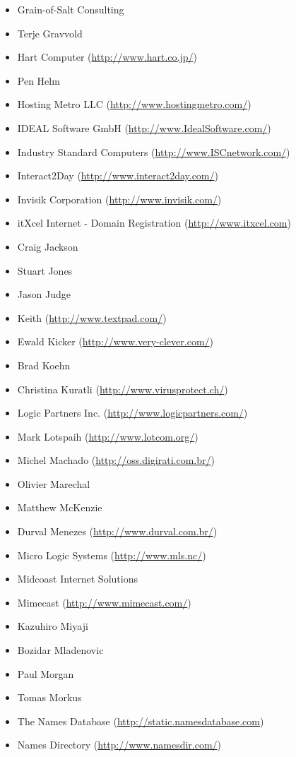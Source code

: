 \documentclass[a4paper,titlepage,12pt]{article}
\begin{document}
\begin{itemize}
	\item Grain-of-Salt Consulting
	\item Terje Gravvold
	\item Hart Computer (\url{http://www.hart.co.jp/})
	\item Pen Helm
	\item Hosting Metro LLC (\url{http://www.hostingmetro.com/})
	\item IDEAL Software GmbH (\url{http://www.IdealSoftware.com/})
	\item Industry Standard Computers (\url{http://www.ISCnetwork.com/})
	\item Interact2Day (\url{http://www.interact2day.com/})
	\item Invisik Corporation (\url{http://www.invisik.com/})
	\item itXcel Internet - Domain Registration (\url{http://www.itxcel.com})
	\item Craig Jackson
	\item Stuart Jones
	\item Jason Judge
	\item Keith (\url{http://www.textpad.com/})
	\item Ewald Kicker (\url{http://www.very-clever.com/})
	\item Brad Koehn
	\item Christina Kuratli (\url{http://www.virusprotect.ch/})
	\item Logic Partners Inc. (\url{http://www.logicpartners.com/})
	\item Mark Lotspaih (\url{http://www.lotcom.org/})
	\item Michel Machado (\url{http://oss.digirati.com.br/})
	\item Olivier Marechal
	\item Matthew McKenzie
	\item Durval Menezes (\url{http://www.durval.com.br/})
	\item Micro Logic Systems (\url{http://www.mls.nc/})
	\item Midcoast Internet Solutions
	\item Mimecast (\url{http://www.mimecast.com/})
	\item Kazuhiro Miyaji
	\item Bozidar Mladenovic
	\item Paul Morgan
	\item Tomas Morkus
	\item The Names Database (\url{http://static.namesdatabase.com})
	\item Names Directory (\url{http://www.namesdir.com/})

\end{itemize}
\end{document}
